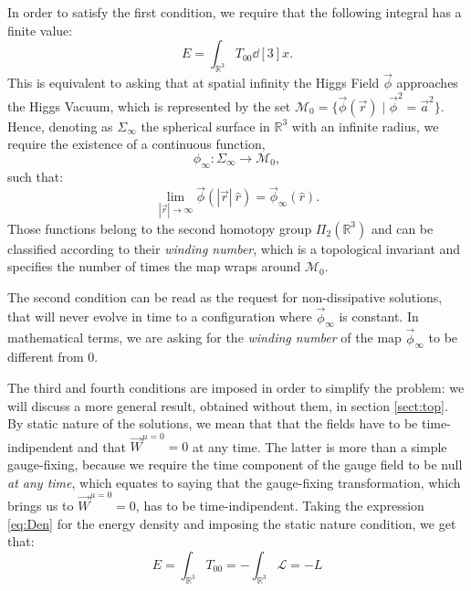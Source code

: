 \documentclass[main.tex]{subfiles}
\begin{document}
 In order to satisfy the first condition, we require that the following integral has a finite value: 
 \begin{equation}
 E = \int_{\mathbb{R}^3} T_{00} \dd[3]{x}.
 \end{equation}
 This is equivalent to asking that at spatial infinity the Higgs Field $\vec{\phi}$ approaches the Higgs Vacuum, which is represented by the set $\mathcal{M}_0 = \{ \vec{\phi}(\vec{r})  \mid  \vec{\phi}^2 = \vec{a}^2 \}$. 
 Hence, denoting as $\Sigma_{\infty}$ the spherical surface in $\mathbb{R}^3$ with an infinite radius, we require the existence of a continuous function, 
 \begin{equation}
     \phi_{\infty} \colon \Sigma_{\infty}  \to \mathcal{M}_0 ,
  \end{equation}
 such that:
 \begin{equation}
     \lim_{|\vec{r}|\to \infty} \vec{\phi}(|\vec{r}| \ \hat{r}) = \vec{\phi}_{\infty}(\hat{r}).
 \end{equation}
  Those functions belong to the second homotopy group $\Pi_2(\mathbb{R}^3)$ and can be classified according to their \textit{winding number}, which is a topological invariant and specifies the number of times the map wraps around $\mathcal{M}_0$.
  \medskip
  
  The second condition can be read as the request for non-dissipative solutions, that will never evolve in time to a configuration where $\vec{\phi}_{\infty}$ is constant. In mathematical terms, we are asking for the \textit{winding number} of the map $\vec{\phi}_{\infty}$ to be different from 0.
  \medskip
  
  The third and fourth conditions are imposed in order to simplify the problem: we will discuss a more general result, obtained without them, in section \ref{sect:top}.
  By static nature of the solutions, we mean that that the fields have to be time-indipendent and that $\vec{W}^{\mu = 0}= 0$ at any time. The latter is more than a simple gauge-fixing, because we require the time component of the gauge field to be null \textit{at any time}, which equates to saying that the gauge-fixing transformation, which brings us to $ \vec{W}^{\mu = 0}= 0$, has to be time-indipendent. Taking the expression \ref{eq:Den} for the energy density and imposing the static nature condition, we get that: 
  \begin{equation}
      E = \int_{\mathbb{R}^3} T_{00} = - \int_{\mathbb{R}^3} \mathcal{L} = -L
      \label{eq:En}
  \end{equation}
 
\end{document}
